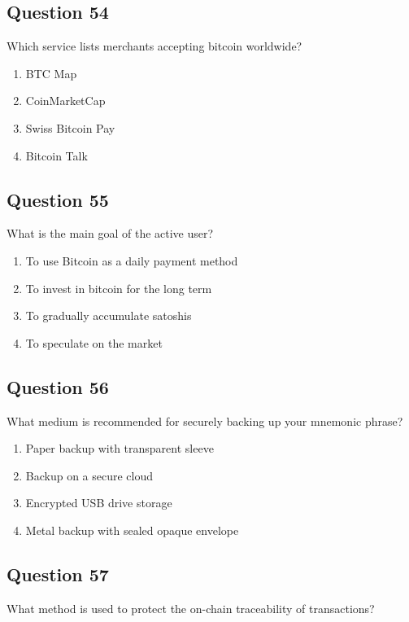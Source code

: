 \documentclass[12pt,a4paper]{article}
\begin{document}
\bigskip


\subsection*{Question 54}
Which service lists merchants accepting bitcoin worldwide?

\begin{enumerate}[label=\Alph*., leftmargin=*]
\item BTC Map
\item CoinMarketCap
\item Swiss Bitcoin Pay
\item Bitcoin Talk
\end{enumerate}

\bigskip


\subsection*{Question 55}
What is the main goal of the active user?

\begin{enumerate}[label=\Alph*., leftmargin=*]
\item To use Bitcoin as a daily payment method
\item To invest in bitcoin for the long term
\item To gradually accumulate satoshis
\item To speculate on the market
\end{enumerate}

\bigskip


\subsection*{Question 56}
What medium is recommended for securely backing up your mnemonic phrase?

\begin{enumerate}[label=\Alph*., leftmargin=*]
\item Paper backup with transparent sleeve
\item Backup on a secure cloud
\item Encrypted USB drive storage
\item Metal backup with sealed opaque envelope
\end{enumerate}

\bigskip


\subsection*{Question 57}
What method is used to protect the on-chain traceability of transactions?
\end{document}
